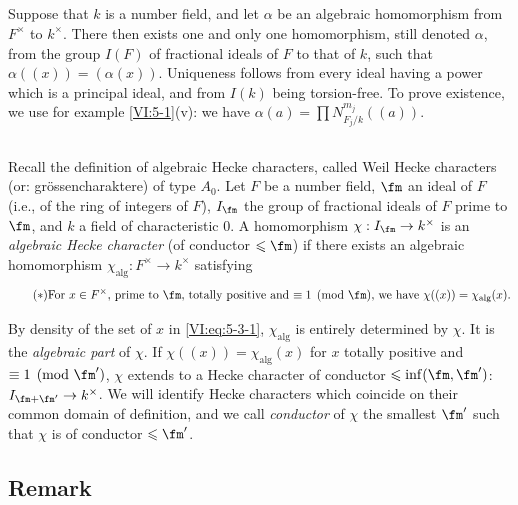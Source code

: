 \subsection{}\label{VI:5-2}

Suppose that $k$ is a number field, and let $\alpha$ be an algebraic
homomorphism from $F^\times$ to $k^\times$. There then exists one and only one
homomorphism, still denoted $\alpha$, from the group $I(F)$ of fractional
ideals of $F$ to that of $k$, such that $\alpha((x))=(\alpha(x))$.
Uniqueness follows from every ideal having a power which is a
principal ideal, and from $I(k)$ being torsion-free. To prove
existence, we use for example \ref{VI:5-1}(v): we have
$\alpha(a) = \prod N_{F_j/k}^{m_j}((a))$. 





\subsection{}\label{VI:5-3}

Recall the definition of algebraic Hecke characters, called
Weil Hecke characters (or: gr\"ossencharaktere) of type $A_0$. Let $F$
be a number field, $\fm$ an ideal of $F$ (i.e., of the ring of integers of
$F$), $I_\fm$ the group of fractional ideals of $F$ prime to $\fm$,
and $k$ a field of characteristic $0$. A homomorphism
$\chi:I_\fm \to k^\times$ is an \emph{algebraic Hecke character} (of
conductor $\leqslant \fm$) if there exists an algebraic homomorphism
$\chi_\text{alg}:F^\times \to k^\times$ satisfying 
\begin{equation*}\tag{$*$}\label{VI:eq:5-3-1}
\text{For $x\in F^\times$, prime to $\fm$, totally positive and
$\equiv 1\pmod\fm$, we have $\chi((x))=\chi_\text{alg}(x)$.}
\end{equation*}

By density of the set of $x$ in \eqref{VI:eq:5-3-1}, $\chi_\text{alg}$
is entirely determined by $\chi$. It is the \emph{algebraic part}
of $\chi$. If $\chi((x))=\chi_\text{alg}(x)$ for $x$ totally positive and
$\equiv 1\pmod{\fm'}$, $\chi$ extends to a Hecke character of
conductor $\leqslant \inf(\fm,\fm')$: $I_{\fm+\fm'}\to k^\times$. We
will identify Hecke characters which coincide on their common domain of
definition, and we call \emph{conductor} of $\chi$ the smallest $\fm'$
such that $\chi$ is of conductor $\leqslant \fm'$. 





\subsection{Remark}\label{VI:5-4}

